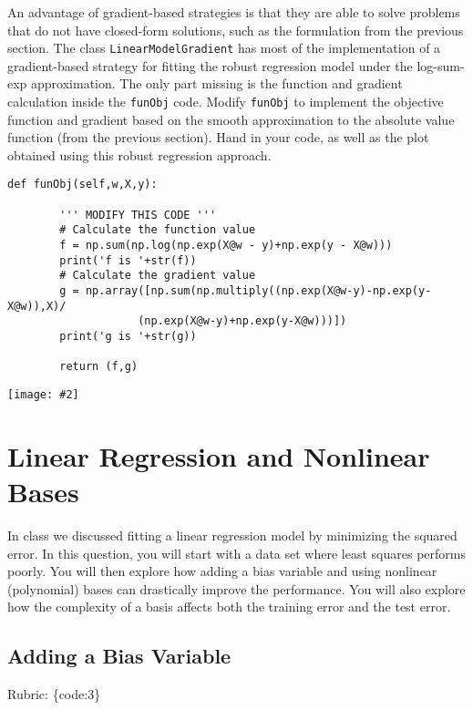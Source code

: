 \documentclass{article}
\def\rubric#1{\gre{Rubric: \{#1\}}}{}
\def\blu#1{{\color{blu}#1}}
\def\gre#1{{\color{gre}#1}}
\newcommand{\centerfig}[2]{\begin{center}\texttt{[image: \#2]}\end{center}}
\begin{document}
An advantage of gradient-based strategies is that they are able to solve
problems that do not have closed-form solutions, such as the formulation from the
previous section. The class \texttt{LinearModelGradient} has most of the implementation
of a gradient-based strategy for fitting the robust regression model under the log-sum-exp approximation.
The only part missing is the function and gradient calculation inside the \texttt{funObj} code.
\blu{Modify \texttt{funObj} to implement the objective function and gradient based on the smooth
approximation to the absolute value function (from the previous section). Hand in your code, as well
as the plot obtained using this robust regression approach.}
\begin{lstlisting}
def funObj(self,w,X,y):

        ''' MODIFY THIS CODE '''
        # Calculate the function value
        f = np.sum(np.log(np.exp(X@w - y)+np.exp(y - X@w)))
        print('f is '+str(f))
        # Calculate the gradient value
        g = np.array([np.sum(np.multiply((np.exp(X@w-y)-np.exp(y-X@w)),X)/
                    (np.exp(X@w-y)+np.exp(y-X@w)))])
        print('g is '+str(g))

        return (f,g)
\end{lstlisting}
\centerfig{.4}{./figs/least_squares_robust.pdf}

\section{Linear Regression and Nonlinear Bases}

In class we discussed fitting a linear regression model by minimizing the squared error.
In this question, you will start with a data set where least squares performs poorly.
You will then explore how adding a bias variable and using nonlinear (polynomial) bases can drastically improve the performance.
You will also explore how the complexity of a basis affects both the training error and the test error.

\subsection{Adding a Bias Variable}
\label{biasvar}
\rubric{code:3}
\end{document}
